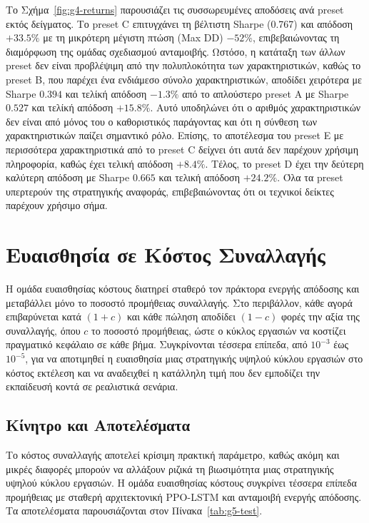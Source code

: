 Το Σχήμα~\ref{fig:g4-returns} παρουσιάζει τις συσσωρευμένες αποδόσεις ανά preset εκτός δείγματος. 
Το preset C επιτυγχάνει τη βέλτιστη Sharpe (0.767) και απόδοση $+33{.}5\%$ με τη μικρότερη μέγιστη πτώση (Max DD) $-52\%$, 
επιβεβαιώνοντας τη διαμόρφωση της ομάδας σχεδιασμού ανταμοιβής. Ωστόσο, η κατάταξη των άλλων preset δεν είναι προβλέψιμη από την πολυπλοκότητα 
των χαρακτηριστικών, καθώς το preset B, που παρέχει ένα ενδιάμεσο σύνολο χαρακτηριστικών, αποδίδει χειρότερα με Sharpe $0{.}394$ και τελίκή απόδοση $-1{.}3\%$ από το απλούστερο preset A με Sharpe $0{.}527$ και τελίκή απόδοση $+15{.}8\%$. 
Αυτό υποδηλώνει ότι ο αριθμός χαρακτηριστικών δεν είναι από μόνος του ο καθοριστικός παράγοντας και ότι η σύνθεση των χαρακτηριστικών παίζει σημαντικό ρόλο. 
Επίσης, το αποτέλεσμα του preset E με περισσότερα χαρακτηριστικά από το preset C δείχνει ότι αυτά δεν παρέχουν χρήσιμη πληροφορία, καθώς έχει τελική απόδοση 
$+8{.}4\%$. Τέλος, το preset D έχει την δεύτερη
καλύτερη απόδοση με Sharpe $0{.}665$ και τελική απόδοση $+24{.}2\%$. Όλα τα preset υπερτερούν 
της στρατηγικής αναφοράς, επιβεβαιώνοντας ότι οι τεχνικοί δείκτες παρέχουν χρήσιμο σήμα.

\section{Ευαισθησία σε Κόστος Συναλλαγής}
\label{sec:exp-fees}

Η ομάδα ευαισθησίας κόστους διατηρεί σταθερό τον πράκτορα ενεργής απόδοσης και μεταβάλλει μόνο το
ποσοστό προμήθειας συναλλαγής. Στο περιβάλλον, κάθε αγορά επιβαρύνεται κατά $(1+c)$ και κάθε πώληση
αποδίδει $(1-c)$ φορές την αξία της συναλλαγής, όπου $c$ το ποσοστό προμήθειας, ώστε ο κύκλος
εργασιών να κοστίζει πραγματικό κεφάλαιο σε κάθε βήμα. Συγκρίνονται τέσσερα επίπεδα, από $10^{-3}$
έως $10^{-5}$, για να αποτιμηθεί η ευαισθησία μιας στρατηγικής υψηλού κύκλου εργασιών στο κόστος
εκτέλεση και να αναδειχθεί η κατάλληλη τιμή που δεν εμποδίζει την εκπαίδευσή κοντά σε ρεαλιστικά σενάρια.

\subsection{Κίνητρο και Αποτελέσματα}
\label{subsec:exp-fees-results}

Το κόστος συναλλαγής αποτελεί κρίσιμη πρακτική παράμετρο, καθώς ακόμη και μικρές διαφορές μπορούν 
να αλλάξουν ριζικά τη βιωσιμότητα μιας στρατηγικής υψηλού κύκλου εργασιών. Η ομάδα ευαισθησίας κόστους συγκρίνει τέσσερα επίπεδα προμήθειας με σταθερή 
αρχιτεκτονική PPO-LSTM και ανταμοιβή ενεργής απόδοσης. Τα αποτελέσματα παρουσιάζονται στον Πίνακα~\ref{tab:g5-test}.

